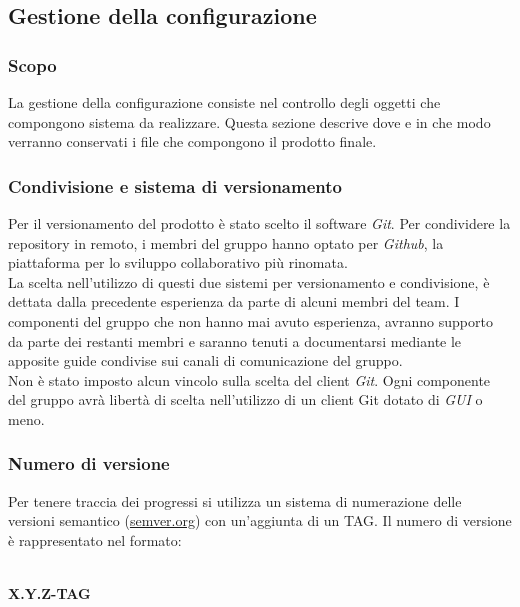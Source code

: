 \subsection{Gestione della configurazione}
\subsubsection{Scopo}
La gestione della configurazione consiste nel controllo degli oggetti che compongono sistema da realizzare. Questa sezione descrive dove e in che modo verranno conservati i file che compongono il prodotto finale.

\subsubsection{Condivisione e sistema di versionamento}
Per il versionamento del prodotto è stato scelto il software \textit{Git\glos}. Per condividere la repository in remoto, i membri del gruppo hanno optato per \textit{Github\glos}, la piattaforma per lo sviluppo collaborativo più rinomata. \\

\noindent La scelta nell'utilizzo di questi due sistemi per versionamento e condivisione, è dettata dalla precedente esperienza da parte di alcuni membri del team. I componenti del gruppo che non hanno mai avuto esperienza, avranno supporto da parte dei restanti membri e saranno tenuti a documentarsi mediante le apposite guide condivise sui canali di comunicazione del gruppo. \\

\noindent Non è stato imposto alcun vincolo sulla scelta del client \textit{Git\glos}. Ogni componente del gruppo avrà libertà di scelta nell'utilizzo di un client Git dotato di \textit{GUI\glo} o meno. 

\subsubsection{Numero di versione}
Per tenere traccia dei progressi si utilizza un sistema di numerazione delle versioni
semantico (\href{https://semver.org/lang/it/}{semver.org}) con un'aggiunta di un TAG.
Il numero di versione è rappresentato nel formato:\\\\

\centerline{\textbf{X.Y.Z-TAG}}


